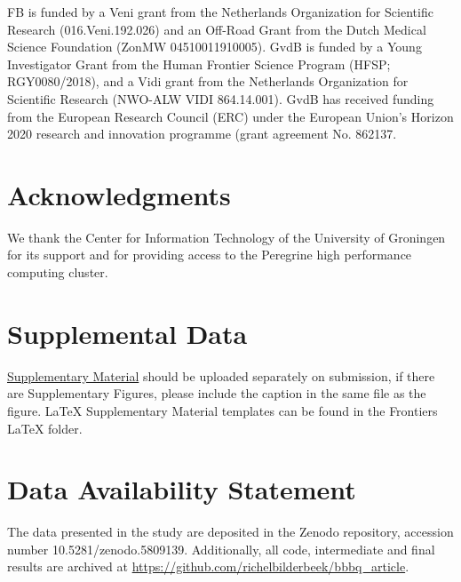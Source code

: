 \documentclass[utf8]{frontiersSCNS} %
\begin{document}

FB is funded by a Veni grant from the Netherlands Organization for Scientific
Research (016.Veni.192.026) and an Off-Road Grant from the Dutch Medical Science Foundation (ZonMW 04510011910005).
GvdB is funded by a Young Investigator Grant from 
the Human Frontier Science Program (HFSP; RGY0080/2018), 
and a Vidi grant from 
the Netherlands Organization for Scientific Research (NWO-ALW VIDI 864.14.001). 
GvdB has received funding from the European Research Council (ERC) 
under the European Union’s Horizon 2020 research and 
innovation programme (grant agreement No. 862137. 

\section*{Acknowledgments}


We thank the Center for Information Technology of the University 
of Groningen for its support and for providing access to the Peregrine 
high performance computing cluster. 

\section*{Supplemental Data}
 \href{http://home.frontiersin.org/about/author-guidelines#SupplementaryMaterial}{Supplementary Material} should be uploaded separately on submission, if there are Supplementary Figures, please include the caption in the same file as the figure. LaTeX Supplementary Material templates can be found in the Frontiers LaTeX folder.

\section*{Data Availability Statement}
The data presented in the study are deposited in the Zenodo repository, accession number 10.5281/zenodo.5809139.
Additionally, all code, intermediate and final results are archived at 
\url{https://github.com/richelbilderbeek/bbbq_article}.


\end{document}
